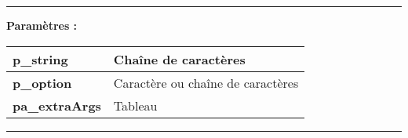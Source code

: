 \documentclass[a4paper,10pt]{article}
\begin{document}

    \par\noindent\rule{\textwidth}{0.4pt}

    \begin{justify}
        \textbf{Paramètres :}

        \begin{tabular}{|l|l|}
            \hline
            \textbf{\color{vars}p\_string} & Chaîne de caractères\\
            \hline
            \textbf{\color{vars}p\_option} & Caractère ou chaîne de caractères\\
            \hline
            \textbf{\color{vars}pa\_extraArgs} & Tableau\\
            \hline
        \end{tabular}
    \end{justify}

    \setlength{\parskip}{2em}


    \par\noindent\rule{\textwidth}{0.4pt}
\end{document}
